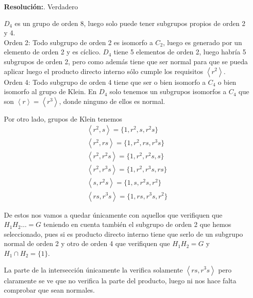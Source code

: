 \documentclass{article}
\begin{document}
\begin{enumerate}
\textbf{Resolución:}. Verdadero

$D_4$ es un grupo de orden 8, luego solo puede tener subgrupos propios de orden 2 y 4. \\

Orden 2: Todo subgrupo de orden 2 es isomorfo a $C_2$, luego es generado por un elemento de orden 2 y es cíclico. $D_4$ tiene 5 elementos de orden 2, luego habría 5 subgrupos de orden 2, pero como además tiene que ser normal para que se pueda aplicar luego el producto directo interno sólo cumple los requisitos $\left\langle r^2\right\rangle$. \\

Orden 4: Todo subgrupo de orden 4 tiene que ser o bien isomorfo a $C_4$ o bien isomorfo al grupo de Klein. En $D_4$ solo tenemos un subgrupos isomorfos a $C_4$ que son $\left\langle r\right\rangle=\left\langle r^3\right\rangle$, donde ninguno de ellos es normal. 

Por otro lado, grupos de Klein tenemos
\begin{gather*}
\left\langle r^2,s\right\rangle=\{1,r^2,s,r^2s\}\\
\left\langle r^2,rs\right\rangle=\{1,r^2,rs,r^3s\}\\
\left\langle r^2,r^2s\right\rangle=\{1,r^2,r^2s,s\}\\
\left\langle r^2,r^3s\right\rangle=\{1,r^2,r^3s,rs\}\\
\left\langle s,r^2s\right\rangle=\{1,s,r^2s,r^2\}\\
\left\langle rs,r^3s\right\rangle=\{1,rs,r^3s,r^2\}
\end{gather*}

De estos nos vamos a quedar únicamente con aquellos que verifiquen que $H_1H_2\ldots =G$ teniendo en cuenta también el subgrupo de orden 2 que hemos seleccionado, pues si es producto directo interno tiene que serlo de un subgrupo normal de orden 2 y otro de orden 4 que verifiquen que $H_1H_2=G$ y $H_1\cap H_2=\{1\}$.

La parte de la intersección únicamente la verifica solamente $\left\langle rs,r^3s\right\rangle$ pero claramente se ve que no verifica la parte del producto, luego ni nos hace falta comprobar que sean normales.

\end{enumerate}
\end{document}
